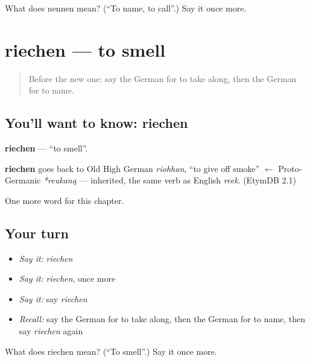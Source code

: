\begin{tcolorbox}[breakable,colback=teal!4,colframe=teal!35!black,title={Before you move on}]
What does nennen mean? (\textquotedblleft{}To name, to call\textquotedblright{}.) Say it once more.
\end{tcolorbox}
\section[riechen]{riechen — to smell}

\label{lesson:GE-C149-riechen}



\begin{quote}
Before the new one: say the German for to take along, then the German for to name.
\end{quote}

\subsection*{You'll want to know: riechen}
\textbf{riechen} — \textquotedblleft{}to smell\textquotedblright{}.

\begin{cousinweb}
\textbf{riechen} goes back to Old High German \emph{riohhan}, \textquotedblleft{}to give off smoke\textquotedblright{} $\leftarrow$ Proto-Germanic \emph{*reukaną} — inherited, the same verb as English \emph{reek}. (EtymDB 2.1)
\end{cousinweb}

\begin{grammarlens}[title={What you've built}]
One more word for this chapter.
\end{grammarlens}

\subsection*{Your turn}
\begin{itemize}
\raggedright
  \item \emph{Say it:} \emph{riechen}
  \item \emph{Say it:} \emph{riechen}, once more
  \item \emph{Say it:} say \emph{riechen}
  \item \emph{Recall:} say the German for to take along, then the German for to name, then say \emph{riechen} again
\end{itemize}

\begin{tcolorbox}[breakable,colback=teal!4,colframe=teal!35!black,title={Before you move on}]
What does riechen mean? (\textquotedblleft{}To smell\textquotedblright{}.) Say it once more.
\end{tcolorbox}
